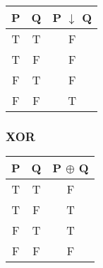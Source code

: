 \begin{multicols}{2}
\begin{table}[H]
\centering
\begin{tabular}[t]{|c|c|c|}
\hline
\textbf{P} & \textbf{Q} & \textbf{P $\downarrow$ Q} \\ \hline
T & T & F \\ \hline
T & F & F \\ \hline
F & T & F \\ \hline
F & F & T \\ \hline
\end{tabular}
\end{table}

\subsubsection{XOR}

\begin{table}[H]
\centering
\begin{tabular}[t]{|c|c|c|}
\hline
\textbf{P} & \textbf{Q} & \textbf{P $\oplus$ Q} \\ \hline
T & T & F \\ \hline
T & F & T \\ \hline
F & T & T \\ \hline
F & F & F \\ \hline
\end{tabular}
\end{table}

\end{multicols}